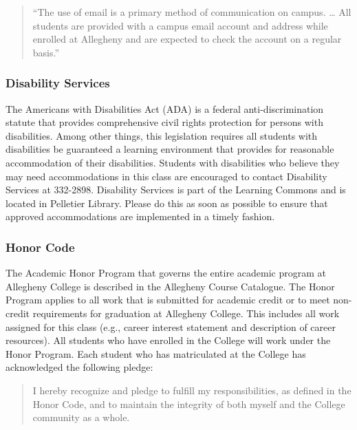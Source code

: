 \vspace*{-.1in}
\begin{quote}
``The use of email is a primary method of communication on campus. \ldots
All students are provided with a campus email account and address while
enrolled at Allegheny and are expected to check the account on a regular
basis.'' 
\end{quote}
\vspace*{-.15in}

\subsubsection*{Disability Services}

The Americans with Disabilities Act (ADA) is a federal anti-discrimination statute that provides comprehensive civil
rights protection for persons with disabilities.  Among other things, this legislation requires all students with
disabilities be guaranteed a learning environment that provides for reasonable accommodation of their disabilities.
Students with disabilities who believe they may need accommodations in this class are encouraged to contact Disability
Services at 332-2898.  Disability Services is part of the Learning Commons and is located in Pelletier Library.
Please do this as soon as possible to ensure that approved accommodations are implemented in a timely fashion.

\subsubsection*{Honor Code}

The Academic Honor Program that governs the entire academic program at Allegheny College is described in the Allegheny
Course Catalogue.  The Honor Program applies to all work that is submitted for academic credit or to meet non-credit
requirements for graduation at Allegheny College.  This includes all work assigned for this class (e.g., career interest
statement and description of career resources).  All students who have enrolled in the College
will work under the Honor Program.  Each student who has matriculated at the College has acknowledged the following
pledge:

\begin{quote}
I hereby recognize and pledge to fulfill my responsibilities, as defined in the Honor Code, and to maintain the
integrity of both myself and the College community as a whole.  
\end{quote}

